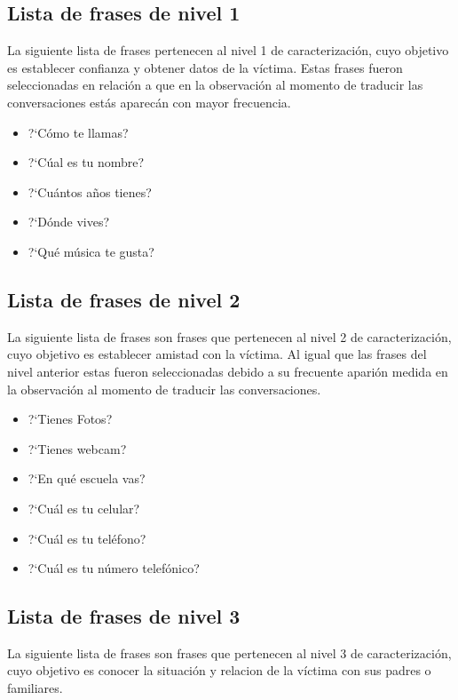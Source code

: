 \subsection{Lista de frases de nivel 1}
La siguiente lista de frases pertenecen al nivel 1 de caracterizaci\'on, cuyo objetivo es establecer confianza y obtener datos de la v\'ictima. Estas frases fueron seleccionadas en relaci\'on a que en la observaci\'on al momento de traducir las conversaciones est\'as aparec\'an con mayor frecuencia.

\begin{itemize}
\item ?`C\'omo te llamas?
\item ?`C\'ual es tu nombre?
\item ?`Cu\'antos a\~nos tienes?
\item ?`D\'onde vives?
\item ?`Qu\'e m\'usica te gusta?
\end{itemize}


\subsection{Lista de frases de nivel 2}
La siguiente lista de frases son frases que pertenecen al nivel 2 de caracterizaci\'on, cuyo objetivo es establecer amistad con la v\'ictima. Al igual que las frases del nivel anterior estas fueron seleccionadas debido a su frecuente apari\'on medida en la observaci\'on al momento de traducir las conversaciones.


\begin{itemize}
\item ?`Tienes Fotos?
\item ?`Tienes webcam?
\item ?`En qu\'e escuela vas?
\item ?`Cu\'al es tu celular?
\item ?`Cu\'al es tu tel\'efono?
\item ?`Cu\'al es tu n\'umero telef\'onico?
\end{itemize}




\subsection{Lista de frases de nivel 3}
La siguiente lista de frases son frases que pertenecen al nivel 3 de caracterizaci\'on, cuyo objetivo es conocer la situaci\'on y relacion de la v\'ictima con sus padres o familiares. 


